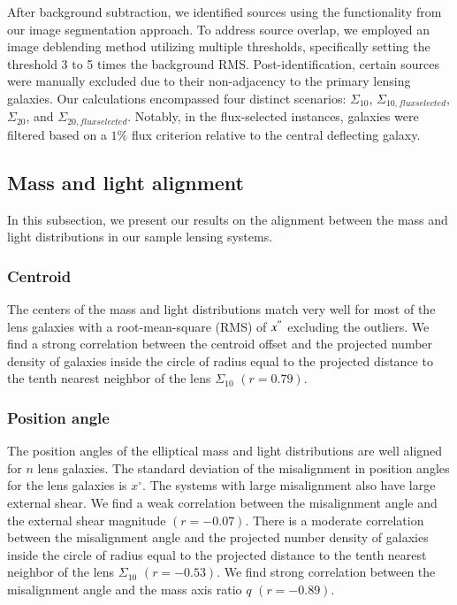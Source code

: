 \documentclass{aa}
\begin{document}
After background subtraction, we identified sources using the  functionality from our image segmentation approach. To address source overlap, we employed an image deblending method utilizing multiple thresholds, specifically setting the threshold 3 to 5 times the background RMS. Post-identification, certain sources were manually excluded due to their non-adjacency to the primary lensing galaxies. Our calculations encompassed four distinct scenarios: $\Sigma_{10}$, $\Sigma_{10, flux selected}$, $\Sigma_{20}$, and $\Sigma_{20, flux selected}$. Notably, in the flux-selected instances, galaxies were filtered based on a $1\%$ flux criterion relative to the central deflecting galaxy.

\subsection{Mass and light alignment}
In this subsection, we present our results on the alignment between the mass and light distributions in our sample lensing systems.
\subsubsection{Centroid}

The centers of the mass and light distributions match very well for most of the lens galaxies with a root-mean-square (RMS) of $x^{^{\prime\prime}} $ excluding the outliers. We find a  strong correlation between the centroid offset and the projected number density of galaxies inside the circle of radius equal to the projected distance to the tenth nearest neighbor of the lens $\Sigma_{10}$  $(r=0.79)$. 

\subsubsection{Position angle}
The position angles of the elliptical mass and light distributions are  well aligned for $n$ lens galaxies. The standard deviation of the misalignment in position angles for the lens galaxies  is $x^{\circ}$.  The systems with large misalignment also have large external shear. We find a weak correlation between the misalignment angle and the external shear magnitude $(r=-0.07)$. There is a moderate correlation between the misalignment angle and the projected number density of galaxies inside the circle of radius equal to the projected distance to the tenth nearest neighbor of the lens $\Sigma_{10}$ $(r=-0.53)$.  We find strong correlation between the misalignment angle and the mass axis ratio $q$ $(r=-0.89)$. 
\end{document}
